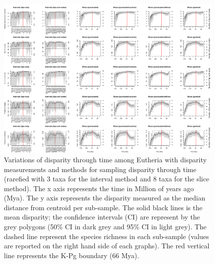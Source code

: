 \documentclass[12pt,letterpaper]{article}
\begin{document}
\begin{landscape}
\begin{figure}[!htbp]
\centering
    \includegraphics[width=\textwidth,height=\textheight,keepaspectratio]{Figures/Figure_S9.pdf}
\caption{\scriptsize{Variations of disparity through time among Eutheria with disparity measurements and methods for sampling disparity through time (rarefied with 3 taxa for the interval method and 8 taxa for the slice method). The x axis represents the time in Million of years ago (Mya). The y axis represents the disparity measured as the median distance from centroid per sub-sample. The solid black lines is the mean disparity; the confidence intervals (CI) are represent by the grey polygons (50\% CI in dark grey and 95\% CI in light grey). The dashed line represent the species richness in each sub-sample (values are reported on the right hand side of each graphs). The red vertical line represents the K-Pg boundary (66 Mya).}}
\end{figure}
\end{landscape}
\end{document}
